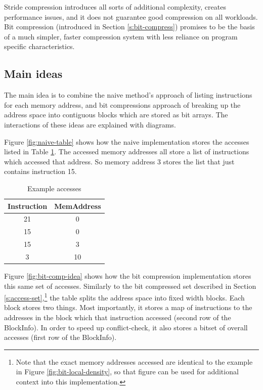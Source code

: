 \documentclass[12pt,twoside]{reedthesis}
\begin{document}
			Stride compression introduces all sorts of additional complexity, creates performance issues, and it does not guarantee good compression on all workloads. Bit compression (introduced in Section \ref{s:bit-compress}) promises to be the basis of a much simpler, faster compression system with less reliance on program specific characteristics. 
			
			
			\subsection{Main ideas}
			
			The main idea is to combine the naive method's approach of listing instructions for each memory address, and bit compressions approach of breaking up the address space into contiguous blocks which are stored as bit arrays. 
			The interactions of these ideas are explained with diagrams.
			
			Figure \ref{fig:naive-table} shows how the naive implementation stores the accesses listed in Table \ref{t:examp-acc}. The accessed memory addresses all store a list of instructions which accessed that address. So memory address 3 stores the list that just contains instruction 15. 
			
			\begin{table}[H]
				\caption{Example accesses}
				\label{t:examp-acc}
				\begin{tabular}{ |c|c| }
					\hline
					Instruction & MemAddress \\ \hline
					21 & 0 \\ \hline
					15 & 0 \\ \hline
					15 & 3 \\ \hline
					3 & 10 \\ \hline
				\end{tabular}
			\end{table}
			
			
			
			Figure \ref{fig:bit-comp-idea} shows how the bit compression implementation stores this same set of accesses. 
			Similarly to  the bit compressed set described in Section \ref{s:access-set},\footnote{Note that the exact memory addresses accessed are identical to the example in Figure \ref{fig:bit-local-density}, so that figure can be used for additional context into this implementation.} the table splits the address space into fixed width blocks. Each block stores two things. Most importantly, it stores a map of instructions to the addresses in the block which that instruction accessed (second row of the BlockInfo). In order to speed up conflict-check, it also stores a bitset of overall accesses (first row of the BlockInfo). 
			
\end{document}
